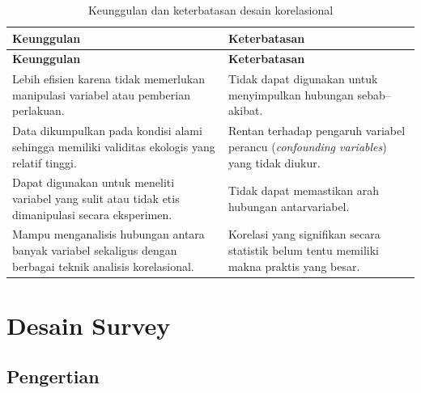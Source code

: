 \documentclass[
  indonesian,
  letterpaper,
  DIV=11,
  numbers=noendperiod]{scrreprt}
\begin{document}
\begin{longtable}[]{@{}
  >{\raggedright\arraybackslash}p{}
  >{\raggedright\arraybackslash}p{}@{}}
\caption{Keunggulan dan keterbatasan desain
korelasional}\label{tbl-korelasional}\tabularnewline
\toprule\noalign{}
\begin{minipage}[b]{\linewidth}\raggedright
\textbf{Keunggulan}
\end{minipage} & \begin{minipage}[b]{\linewidth}\raggedright
\textbf{Keterbatasan}
\end{minipage} \\
\midrule\noalign{}
\endfirsthead
\toprule\noalign{}
\begin{minipage}[b]{\linewidth}\raggedright
\textbf{Keunggulan}
\end{minipage} & \begin{minipage}[b]{\linewidth}\raggedright
\textbf{Keterbatasan}
\end{minipage} \\
\midrule\noalign{}
\endhead
\bottomrule\noalign{}
\endlastfoot
Lebih efisien karena tidak memerlukan manipulasi variabel atau pemberian
perlakuan. & Tidak dapat digunakan untuk menyimpulkan hubungan
sebab--akibat. \\
Data dikumpulkan pada kondisi alami sehingga memiliki validitas ekologis
yang relatif tinggi. & Rentan terhadap pengaruh variabel perancu
(\emph{confounding variables}) yang tidak diukur. \\
Dapat digunakan untuk meneliti variabel yang sulit atau tidak etis
dimanipulasi secara eksperimen. & Tidak dapat memastikan arah hubungan
antarvariabel. \\
Mampu menganalisis hubungan antara banyak variabel sekaligus dengan
berbagai teknik analisis korelasional. & Korelasi yang signifikan secara
statistik belum tentu memiliki makna praktis yang besar. \\
\end{longtable}

\section{Desain Survey}\label{desain-survey}

\subsection{Pengertian}\label{pengertian-1}
\end{document}
